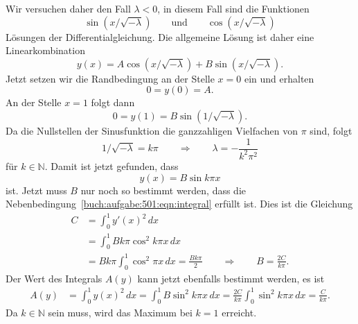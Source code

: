 \begin{loesung}
Wir versuchen daher den Fall $\lambda<0$, in diesem Fall sind die
Funktionen
\[
\sin(x/\!\sqrt{-\lambda})
\qquad\text{und}\qquad
\cos(x/\!\sqrt{-\lambda})
\]
Lösungen der Differentialgleichung.
Die allgemeine Lösung ist daher eine Linearkombination
\[
y(x)
=
A \cos(x/\!\sqrt{-\lambda})
+
B \sin(x/\!\sqrt{-\lambda}).
\]
Jetzt setzen wir die Randbedingung an der Stelle $x=0$ ein und erhalten
\[
0
=
y(0)
=
A.
\]
An der Stelle $x=1$ folgt dann
\[
0=y(1)
=
B\sin(1/\!\sqrt{-\lambda}).
\]
Da die Nullstellen der Sinusfunktion die ganzzahligen Vielfachen von $\pi$
sind, folgt
\[
1/\!\sqrt{-\lambda} = k\pi
\qquad\Rightarrow\qquad
\lambda = -\frac{1}{k^2\pi^2}
\]
für $k\in\mathbb{N}$.
Damit ist jetzt gefunden, dass
\[
y(x) = B \sin k\pi x
\]
ist.
Jetzt muss $B$ nur noch so bestimmt werden, dass die
Nebenbedingung~\eqref{buch:aufgabe:501:eqn:integral} erfüllt ist.
Dies ist die Gleichung
\begin{align*}
C
&=
\int_0^1 y'(x)^2\,dx
\\
&=
\int_0^1 B k\pi \cos^2 k\pi x\,dx
\\
&=
Bk\pi \int_0^1 \cos^2 \pi x\,dx
=
\frac{Bk\pi}2
\qquad
\Rightarrow
\qquad
B
=
\frac{2C}{k\pi}.
\end{align*}
Der Wert des Integrals $A(y)$ kann jetzt ebenfalls bestimmt werden, es
ist
\begin{align*}
A(y)
&=
\int_0^1 y(x)^2\,dx
=
\int_0^1 B\sin^2 k\pi x\,dx
=
\frac{2C}{k\pi} \int_0^1 \sin^2k\pi x\,dx
=
\frac{C}{k\pi}.
\end{align*}
Da $k\in\mathbb{N}$ sein muss, wird das Maximum bei $k=1$ erreicht.
\end{loesung}
